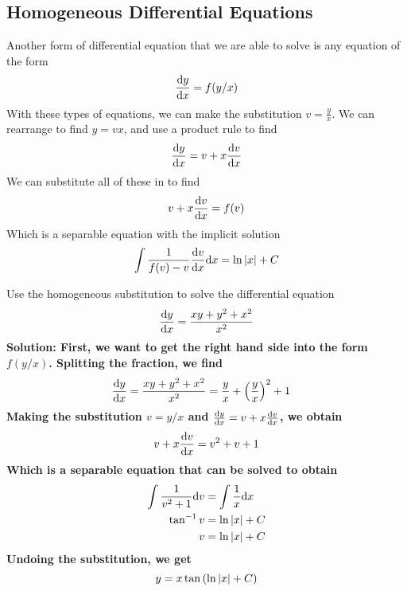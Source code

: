 \subsection{Homogeneous Differential Equations}
Another form of differential equation that we are able to solve is any equation of the form
\[ \dv{y}{x} = f(y/x) \]
With these types of equations, we can make the substitution $v = \frac{y}{x}$. We can rearrange to find $y=vx$, and use a product rule to find 
\[ \dv{y}{x} = v + x\dv{v}{x} \]
We can substitute all of these in to find
\[ v + x\dv{v}{x} = f(v) \]
Which is a separable equation with the implicit solution
\[ \int \frac{1}{f(v)-v}\dv{v}{x}\dd x = \ln \abs{x} + C\]
\begin{example}
    Use the homogeneous substitution to solve the differential equation 
    \[ \dv{y}{x} = \frac{xy+y^2+x^2}{x^2}\]
    \bf{Solution:} First, we want to get the right hand side into the form $f(y/x)$. Splitting the fraction, we find
    \begin{align*}
        \dv{y}{x} = \frac{xy+y^2+x^2}{x^2} &= \frac{y}{x} + \pqty{\frac{y}{x}}^2 + 1
    \end{align*}
    Making the substitution $v=y/x$ and $\dv{y}{x} = v + x\dv{v}{x}$, we obtain
    \begin{align*}
        v + x\dv{v}{x} = v^2+v+1
    \end{align*}
    Which is a separable equation that can be solved to obtain
    \begin{align*}
        \int \frac{1}{v^2+1}\dd v &= \int \frac{1}{x}\dd x \\
        \tan^{-1}v &= \ln\abs{x} + C \\
        v &= \ln\abs{x}+C
    \end{align*}
    Undoing the substitution, we get 
    \[ y = x\tan\pqty{\ln\abs{x} + C} \]
\end{example}
